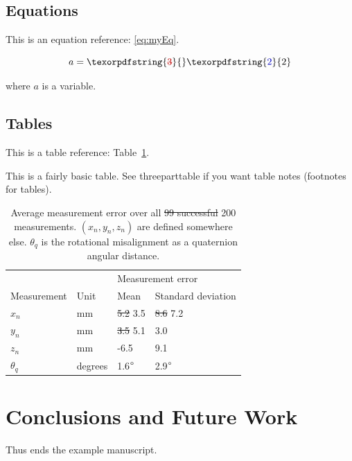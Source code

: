 \documentclass[preprint,3p,11pt,sort]{elsarticle}
\makeatletter
\newcommand{\tbref}[1]{Table~\ref{#1}}
\providecommand{\DIFaddtex}[1]{{\protect\color{difBlue}#1}} %
\providecommand{\DIFdeltex}[1]{{\protect\color{difRed}\sout{#1}}} %
\providecommand{\DIFaddFL}[1]{\DIFadd{#1}} %
\providecommand{\DIFdelFL}[1]{\DIFdel{#1}} %
\providecommand{\DIFadd}[1]{\texorpdfstring{\DIFaddtex{#1}}{#1}} %
\providecommand{\DIFdel}[1]{\texorpdfstring{\DIFdeltex{#1}}{}} %
\let\sout@orig\sout %
\renewcommand{\sout}[1]{\ifmmode\text{\sout@orig{\ensuremath{#1}}}\else\sout@orig{#1}\fi} %
\makeatother
\begin{document}
\subsection{Equations}
This is an equation reference: \eqref{eq:myEq}.

\begin{equation} \label{eq:myEq}
    a =  \DIFdel{3
}  \DIFadd{2
} \end{equation}

where $a$ is a variable.


\subsection{Tables}
This is a table reference: \tbref{tb:myTable}.

This is a fairly basic table. See threeparttable if you want table notes (footnotes for tables).

\begin{table}[!h]
    \centering
    \begin{tabular}{llll}
        \hline
        & & \multicolumn{2}{l}{Measurement error}\\
        Measurement & Unit & Mean & Standard deviation\\
        \hline
        $x_n$ & mm &  \DIFdelFL{5.2 }  \DIFaddFL{3.5 } &  \DIFdelFL{8.6}  \DIFaddFL{7.2} \\
        $y_n$ & mm &  \DIFdelFL{3.5 }  \DIFaddFL{5.1 } & 3.0\\
        $z_n$ & mm & -6.5 & 9.1\\
        $\theta_q$ & degrees & 1.6$\degree$ & 2.9$\degree$\\
        \hline
        \end{tabular}
    \caption{Average measurement error over all  \DIFdelFL{99 successful }  \DIFaddFL{200 } measurements. $(x_n, y_n, z_n)$ are defined somewhere else. $\theta_q$ is the rotational misalignment as a quaternion angular distance.}
    \label{tb:myTable}
\end{table}


\section{Conclusions and Future Work} \label{sec:conclusions}
Thus ends the example manuscript.
\end{document}
